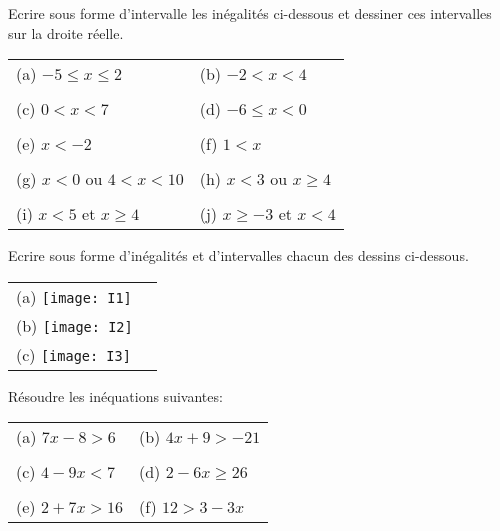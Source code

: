 
\begin{exercice}
Ecrire sous forme d’intervalle les inégalités ci-dessous et dessiner ces intervalles sur la droite réelle.\\

\renewcommand{\arraystretch}{0.8}
\begin{tabular}{p{4cm}p{4cm}}
(a) $-5\leq x \leq 2$ & (b) $-2 < x < 4$\\
&\\
(c) $0<x<7$ & (d) $-6 \leq x < 0$\\
&\\
(e) $x<-2$ & (f) $1<x$\\
&\\
(g) $x<0$ ou $4<x<10$ & (h) $x<3$ ou $x\geq 4$\\
&\\
(i) $x<5$ et $x\geq 4$ & (j) $x\geq -3$ et $x< 4$\\
\end{tabular}
\end{exercice}

\begin{exercice}
Ecrire sous forme d’inégalités et d’intervalles chacun des dessins ci-dessous.\\

\renewcommand{\arraystretch}{0.8}
\begin{tabular}{p{6cm}p{1cm}}
(a) \texttt{[image: I1]}
 &\\
 (b) \texttt{[image: I2]}
&\\
(c) \texttt{[image: I3]}
\end{tabular}
\end{exercice}


\begin{exercice}
Résoudre les inéquations suivantes:\\

\renewcommand{\arraystretch}{0.8}
\begin{tabular}{p{4cm}p{4cm}}
(a) $7x-8 > 6$ & (b) $4x+9>-21$\\
&\\
(c) $4-9x<7$ & (d) $2-6x\geq26$\\
&\\
(e) $2+7x>16$ & (f) $12>3-3x$\\
\end{tabular}
\end{exercice}

